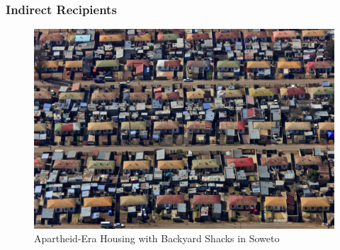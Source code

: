 \documentclass[aspectratio=32]{beamer}
\begin{document}
\begin{frame}
\frametitle{Indirect Recipients}
\centering

\begin{figure}
 \includegraphics[scale=.25]{figures/shacks.jpg} 
 \caption{Apartheid-Era Housing with Backyard Shacks in Soweto}
\end{figure}

\end{frame}

\end{document}
